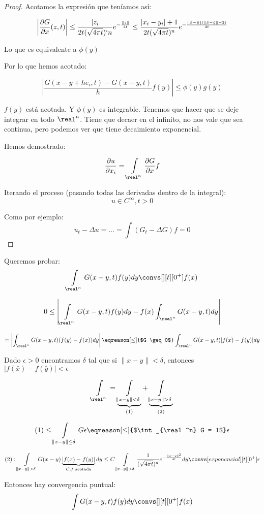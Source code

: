 \begin{proof}
			Acotamos la expresión que teníamos así:

			\[ \left| \frac{\partial G}{\partial x}(z,t) \right|  \leq \frac{|z_i}{2t (\sqrt{4\pi t})`n} e^{-\frac{\|z\|}{4t}} \leq \frac{|x_i-y_i| +1}{2t(\sqrt{4 \pi t})^n} e^{-\frac{\|\bar{x}-\bar{y}\| (\|\bar{x}-\bar{y}\| -2)}{4t}}\]

			Lo que es equivalente a $\phi(y)$

			Por lo que hemos acotado:

			\[ \left| \frac{G(x-y+he_i,t) - G(x-y,t)}{h} f(y) \right| \leq \phi(y) g(y) \]

			$f(y)$ está acotada. Y $\phi(y)$ es integrable. Tenemos que hacer que se deje integrar en todo $\real^n$. Tiene que decaer en el infinito, no nos vale que sea continua, pero podemos ver que tiene decaimiento exponencial.

			Hemos demostrado:

			\[ \frac{\partial u}{\partial x_i} = \int\limits_{\real^n}\frac{\partial G}{\partial x} f\]

			Iterando el proceso (pasando todas las derivadas dentro de la integral):
			\[ u \in C^\infty, t> 0\]

			Como por ejemplo:
			\[ u_t - \Delta u = … = \int(G_t- \Delta G) f = 0\]


		\end{proof}

		\begin{example}

			Queremos probar:
			\[ \int\limits_{\real^n} G(x-y,t) f(y) dy \convs[][t][0^+] f(x)\]

			\[ 0 \leq \left| \int\limits_{\real^n} G(x-y,t) f(y) dy - f(x) \int_{\real^n} G(x-y,t) dy \right|\]

			\[ = \left| \int_{\real^n} G(x-y,t) (f(y)-f(x))dy \right| \eqreason[\leq]{$G \geq 0$} \int_{\real^n} G(x-y,t) |f(x) - f(y)| dy \]

			Dado $\epsilon > 0$ encontramos $\delta$ tal que si $\|x-y\| < \delta$, entonces $|f(\bar{x})-f(\bar{y})| < \epsilon$

			\[ \int\limits_{\real^n} = \underbrace{\int\limits_{\|x-y\| < \delta}}_{(1)} + \underbrace{\int\limits_{\|x-y\|>\delta}}_{(2)}\]

			\[ (1) \leq \int\limits_{\|x-y\|\leq \delta} G \epsilon \eqreason[\leq]{$\int_{\real^n} G = 1$} \epsilon\]

			\[ (2): \int\limits_{\|x-y\|>\delta} G(x-y) \underbrace{| f(x) - f(y) |}_{C,f \text{ acotada}} dy \leq C \int\limits_{\|x-y\| > \delta} \frac{1}{(\sqrt{4\pi t})^n} e^{-\frac{\|x-y\|^2}{4t}} dy \convs[exponencial][t][0^+] \epsilon\]

			Entonces hay convergencia puntual:
			\[\int G(x-y,t) f(y) dy \convs[][t][0^+] f(x)\]

		\end{example}


